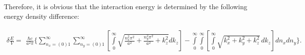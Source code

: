 \documentclass[twoside, 10pt]{article}
\begin{document}
\begin{multicols}{2}

Therefore, it is obvious that the interaction energy is determined by the following energy density difference:
\end{multicols}
\noindent

\vspace{-3.5mm}
    \begin{equation} \label{eq:2}
\begin{array}{lr}
\delta \frac{E}{V} =
\begin{array}{c}
\frac{\hbar c}{a^2 \pi}\Bigg\{\sum\limits_{n_x=(0)1}^{\infty}\sum\limits_{n_y=(0)1}^{\infty}\left[\int\limits_{0}^{\infty}\sqrt{\frac{n_x^2 \pi^2}{a^2}+\frac{n_y^2 \pi^2}{a^2}+k_z^2} dk_z\right] %
-\int\limits_{0}^{\infty}\int\limits_{0}^{\infty}\left[\int\limits_{0}^{\infty}\sqrt{k_x^2+k_y^2+k_z^2}\,dk_z\right] dn_x dn_y\Bigg\}.
\end{array}\end{array}\end{equation}
\vspace{-3.5mm}
\end{document}
